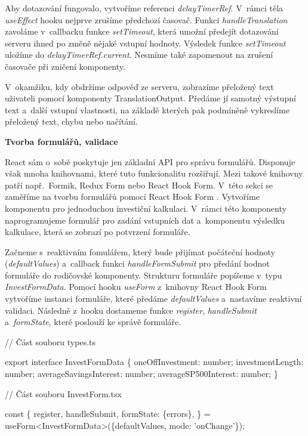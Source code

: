 Aby dotazování fungovalo, vytvoříme referenci \emph{delayTimerRef}. V~rámci těla \emph{useEffect} hooku nejprve zrušíme předchozí časovač. 
Funkci \emph{handleTranslation} zavoláme v~callbacku funkce \emph{setTimeout}, která umožní předejít dotazování serveru ihned po změně nějaké vstupní hodnoty. 
Výsledek funkce \emph{setTimeout} uložíme do \emph{delayTimerRef.current}. Nesmíme také zapomenout na zrušení časovače při zničení komponenty.

V~okamžiku, kdy obdržíme odpověď ze serveru, zobrazíme přeložený text uživateli pomocí komponenty TranslationOutput. 
Předáme jí samotný výstupní text a~další vstupní vlastnosti, na základě kterých pak podmíněně vykreslíme přeložený text, chybu nebo načítání.

\begin{flushleft}
  \textbf{Tvorba formulářů, validace}
\end{flushleft}

React sám o~sobě poskytuje jen základní API pro správu formulářů. Disponuje však mnoha knihovnami, které tuto funkcionalitu rozšiřují. 
Mezi takové knihovny patří např.~Formik, Redux Form nebo React Hook Form. V~této sekci se zaměříme na tvorbu formulářů pomocí React Hook Form \cite{reacthookformlib}. 
Vytvoříme komponentu pro jednoduchou investiční kalkulaci. 
V~rámci této komponenty naprogramujeme formulář pro zadání vstupních dat a~komponentu výsledku kalkulace, která se zobrazí po potvrzení formuláře.

Začneme s~reaktivním fomulářem, který bude přijímat počáteční hodnoty (\emph{defaultValues}) a~callback funkci \emph{handleFormSubmit} pro předání hodnot formuláře do rodičovské komponenty. 
Strukturu formuláře popíšeme v~typu \emph{InvestFormData}. Pomocí hooku \emph{useForm} z~knihovny React Hook Form vytvoříme instanci formuláře, které předáme \emph{defaultValues} a~nastavíme reaktivní validaci. 
Následně z~hooku dostameme funkce \emph{register}, \emph{handleSubmit} a~\emph{formState}, které poslouží ke správě formuláře.

\begin{prog}
// Část souboru types.ts

export interface InvestFormData \{
  oneOffInvestment: number;
  investmentLength: number;
  averageSavingsInterest: number;
  averageSP500Interest: number;
\}

// Část souboru InvestForm.tsx

const \{
  register,
  handleSubmit,
  formState: \{errors\},
\} = useForm<InvestFormData>(\{defaultValues, mode: 'onChange'\});
\end{prog}

